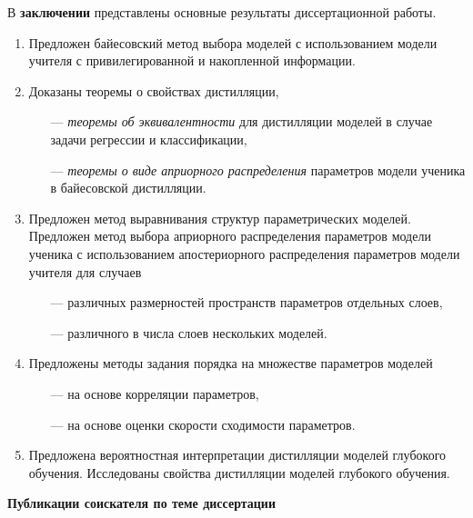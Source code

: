 \documentclass{dissert}
\begin{document}
В \textbf{заключении} представлены основные результаты диссертационной работы.
\begin{enumerate}
    \item Предложен байесовский метод выбора моделей с использованием модели учителя с привилегированной и накопленной информации.
    \item Доказаны теоремы о свойствах дистилляции, 
    \begin{itemize}
        \item[---] \emph{теоремы об эквивалентности} для дистилляции моделей в случае задачи регрессии и классификации,
        \item[---] \emph{теоремы о виде априорного распределения} параметров модели ученика в байесовской дистилляции.
    \end{itemize}
    \item Предложен метод выравнивания структур параметрических моделей. Предложен метод выбора априорного распределения параметров модели ученика с использованием апостериорного распределения параметров модели учителя для случаев
    \begin{itemize}
        \item[---] различных размерностей пространств параметров отдельных слоев,
        \item[---] различного в числа слоев нескольких моделей.
    \end{itemize}
    \item Предложены методы задания порядка на множестве параметров моделей
    \begin{itemize}
        \item[---] на основе корреляции параметров,
        \item[---] на основе оценки скорости сходимости параметров.
    \end{itemize}
    \item Предложена вероятностная интерпретации дистилляции моделей глубокого обучения. Исследованы свойства дистилляции моделей глубокого обучения.
\end{enumerate}

\textbf{Публикации соискателя по теме диссертации}
\end{document}
